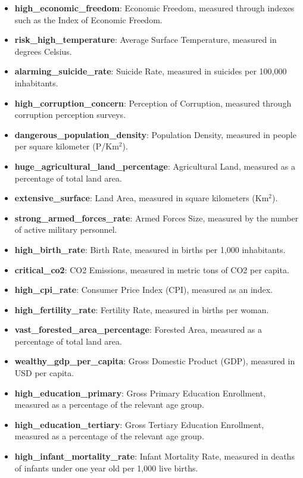 \documentclass[fleqn,11pt]{article}
\begin{document}
\begin{itemize}
    \item \textbf{high\_economic\_freedom}: Economic Freedom, measured through indexes such as the Index of Economic Freedom.
    \item \textbf{risk\_high\_temperature}: Average Surface Temperature, measured in degrees Celsius.
    \item \textbf{alarming\_suicide\_rate}: Suicide Rate, measured in suicides per 100,000 inhabitants.
    \item \textbf{high\_corruption\_concern}: Perception of Corruption, measured through corruption perception surveys.
    \item \textbf{dangerous\_population\_density}: Population Density, measured in people per square kilometer (P/Km\(^2\)).
    \item \textbf{huge\_agricultural\_land\_percentage}: Agricultural Land, measured as a percentage of total land area.
    \item \textbf{extensive\_surface}: Land Area, measured in square kilometers (Km\(^2\)).
    \item \textbf{strong\_armed\_forces\_rate}: Armed Forces Size, measured by the number of active military personnel.
    \item \textbf{high\_birth\_rate}: Birth Rate, measured in births per 1,000 inhabitants.
    \item \textbf{critical\_co2}: CO2 Emissions, measured in metric tons of CO2 per capita.
    \item \textbf{high\_cpi\_rate}: Consumer Price Index (CPI), measured as an index.
    \item \textbf{high\_fertility\_rate}: Fertility Rate, measured in births per woman.
    \item \textbf{vast\_forested\_area\_percentage}: Forested Area, measured as a percentage of total land area.
    \item \textbf{wealthy\_gdp\_per\_capita}: Gross Domestic Product (GDP), measured in USD per capita.
    \item \textbf{high\_education\_primary}: Gross Primary Education Enrollment, measured as a percentage of the relevant age group.
    \item \textbf{high\_education\_tertiary}: Gross Tertiary Education Enrollment, measured as a percentage of the relevant age group.
    \item \textbf{high\_infant\_mortality\_rate}: Infant Mortality Rate, measured in deaths of infants under one year old per 1,000 live births.

\end{itemize}
\end{document}
